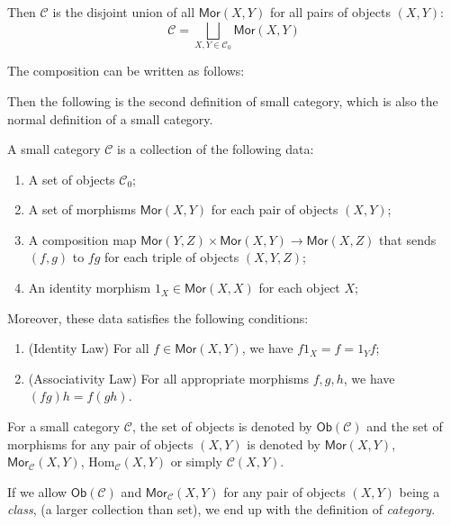 \documentclass[
	11pt, %
	fleqn, %
	a4paper, %
]{LegrandOrangeBook}
\newcommand{\C}{\mathcal{C}} %
\newcommand{\Mor}{\mathsf{Mor}} %
\newcommand{\Ob}[1]{\mathsf{Ob}(#1)} %
\begin{document}
Then $\C$ is the disjoint union of all $\Mor(X, Y)$ for all pairs of objects $(X, Y)$:
\[
    \C = \bigsqcup_{X, Y \in \C_0} \Mor(X, Y)
\]
\begin{remark}
    The composition can be written as follows:
    \begin{center}
    \end{center}
\end{remark}

Then the following is the second definition of small category, which is also the normal definition of a small category.

\begin{definition}
    A small category $\C$ is a collection of the following data:
    \begin{enumerate}
        \item A set of objects $\C_0$;
        \item A set of morphisms $\Mor(X, Y)$ for each pair of objects $(X, Y)$;
        \item A composition map $\Mor(Y, Z) \times \Mor(X, Y) \to \Mor(X, Z)$ that sends $(f, g)$ to $fg$ for each triple of objects $(X, Y, Z)$;
        \item An identity morphism $1_X \in \Mor(X, X)$ for each object $X$;
    \end{enumerate}
    Moreover, these data satisfies the following conditions:
    \begin{enumerate}[label=(\alph*)]
        \item (Identity Law) For all $f \in \Mor(X, Y)$, we have $f 1_X = f = 1_Y f$;
        \item (Associativity Law) For all appropriate morphisms $f, g, h$, we have $(fg)h = f(gh)$.
    \end{enumerate}
\end{definition}

For a small category $\C$, the set of objects is denoted by $\Ob{\C}$ and the set of morphisms for any pair of objects $(X, Y)$ is denoted by $\Mor(X, Y)$, $\Mor_{\C} (X, Y)$, Hom$_{\C}(X, Y)$ or simply $\C(X, Y)$.

If we allow $\Ob{\C}$ and $\Mor_{\C}(X, Y)$ for any pair of objects $(X, Y)$ being a \emph{class}, (a larger collection than set), we end up with the definition of \emph{category}.
\end{document}
